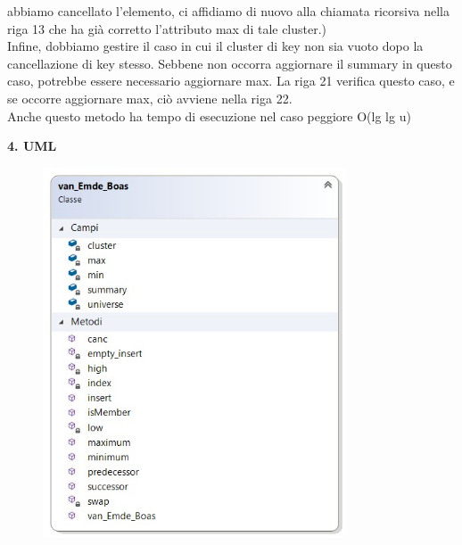 \documentclass{article}
\begin{document}
\begin{flushleft}
            abbiamo cancellato l'elemento, ci affidiamo di nuovo alla chiamata ricorsiva nella riga 13 che ha già corretto l'attributo max di tale cluster.)\\
            Infine, dobbiamo gestire il caso in cui il cluster di key non sia vuoto dopo la cancellazione di key stesso. Sebbene non occorra aggiornare il summary in questo caso, potrebbe essere necessario aggiornare max. La riga 21 verifica questo caso, e se occorre aggiornare max, ciò avviene nella riga 22. \\
            Anche questo metodo ha tempo di esecuzione nel caso peggiore O(lg lg u)
            

\end{flushleft}

\newpage
\begin{flushleft}
\huge \textbf{4. UML}
\newline
\newline
\normalsize
    \begin{figure}[h!]
    \begin{center}
    \includegraphics[width=9cm]{UML.jpeg}\\
    \end{center}
\end{figure}
\end{flushleft}
 
\end{document}
